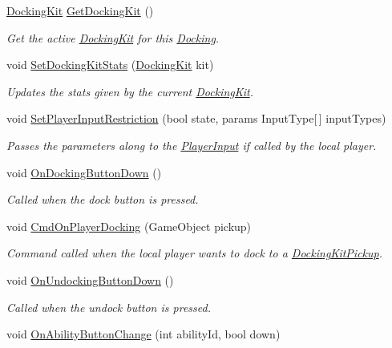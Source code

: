 \begin{DoxyCompactItemize}
\hyperlink{class_docking_kit}{Docking\+Kit} \hyperlink{class_docking_a162b008bbd0d9fda84fe489e571502cd}{Get\+Docking\+Kit} ()
\begin{DoxyCompactList}\small\item\em Get the active \hyperlink{class_docking_kit}{Docking\+Kit} for this \hyperlink{class_docking}{Docking}. \end{DoxyCompactList}\item 
void \hyperlink{class_docking_ae17ab0c0fc119ad63467036d90c9369b}{Set\+Docking\+Kit\+Stats} (\hyperlink{class_docking_kit}{Docking\+Kit} kit)
\begin{DoxyCompactList}\small\item\em Updates the stats given by the current \hyperlink{class_docking_kit}{Docking\+Kit}. \end{DoxyCompactList}\item 
void \hyperlink{class_docking_af4528d1af51f10ab75d161095f6eb7f3}{Set\+Player\+Input\+Restriction} (bool state, params Input\+Type\mbox{[}$\,$\mbox{]} input\+Types)
\begin{DoxyCompactList}\small\item\em Passes the parameters along to the \hyperlink{class_player_input}{Player\+Input} if called by the local player. \end{DoxyCompactList}\item 
void \hyperlink{class_docking_ace85f096874db1f744af753a2f9e44ce}{On\+Docking\+Button\+Down} ()
\begin{DoxyCompactList}\small\item\em Called when the dock button is pressed. \end{DoxyCompactList}\item 
void \hyperlink{class_docking_af3c0779cf0d84911417822b5ec2c671f}{Cmd\+On\+Player\+Docking} (Game\+Object pickup)
\begin{DoxyCompactList}\small\item\em Command called when the local player wants to dock to a \hyperlink{class_docking_kit_pickup}{Docking\+Kit\+Pickup}. \end{DoxyCompactList}\item 
void \hyperlink{class_docking_aaeaafb7445f24b6f8ca47d75f58e6e88}{On\+Undocking\+Button\+Down} ()
\begin{DoxyCompactList}\small\item\em Called when the undock button is pressed. \end{DoxyCompactList}\item 
void \hyperlink{class_docking_a3a17da1f77bcf2789a159a1489481bec}{On\+Ability\+Button\+Change} (int ability\+Id, bool down)

\end{DoxyCompactItemize}
